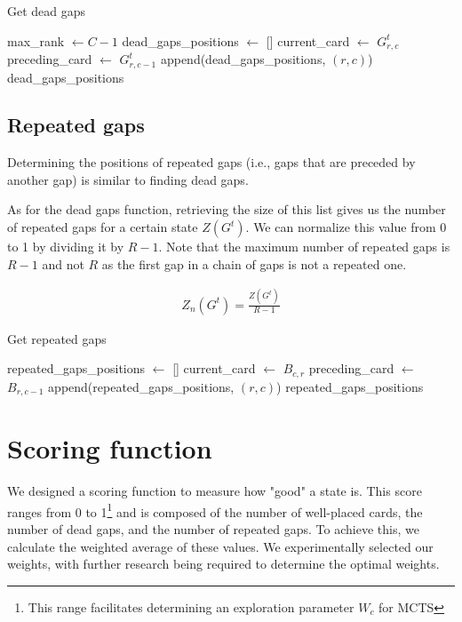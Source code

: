 \begin{algorithm}[H]
    \caption{Get dead gaps}
    \begin{algorithmic}
        \State max\_rank $\gets C-1$
        \State dead\_gaps\_positions $\gets$ []
                \State current\_card $\gets$ $G^t_{r,c}$
                \State preceding\_card $\gets$ $G^t_{r,c - 1}$
                    \State append(dead\_gaps\_positions, $(r,c)$)
                \EndIf
            \EndFor
        \EndFor
        \Return dead\_gaps\_positions
    \end{algorithmic}
\end{algorithm}

\subsection{Repeated gaps}
Determining the positions of repeated gaps (i.e., gaps that are preceded by another gap) is similar to finding dead gaps.

As for the dead gaps function, retrieving the size of this list gives us the number of repeated gaps for a certain state $Z\left(G^t\right)$. We can normalize this value from 0 to 1 by dividing it by $R-1$.
Note that the maximum number of repeated gaps is $R-1$ and not $R$ as the first gap in a chain of gaps is not a repeated one.

\begin{align}
    Z_n\left(G^t\right) = \frac{Z\left(G^t\right)}{R-1}
\end{align}

\begin{algorithm}[H]
    \caption{Get repeated gaps}
    \begin{algorithmic}
        \State repeated\_gaps\_positions $\gets$ []
                \State current\_card $\gets$ $B_{c,r}$
                \State preceding\_card $\gets$ $B_{r,c-1}$
                    \State append(repeated\_gaps\_positions, $(r,c)$)
                \EndIf
            \EndFor
        \EndFor
        \Return repeated\_gaps\_positions
    \end{algorithmic}
\end{algorithm}

\section{Scoring function} \label{score}
We designed a scoring function to measure how "good" a state is. This score ranges from 0 to 1\footnote{This range facilitates determining an exploration parameter $W_c$ for MCTS} and is composed of the number of well-placed cards, the number of dead gaps, and the number of repeated gaps. To achieve this, we calculate the weighted average of these values. We experimentally selected our weights, with further research being required to determine the optimal weights.

